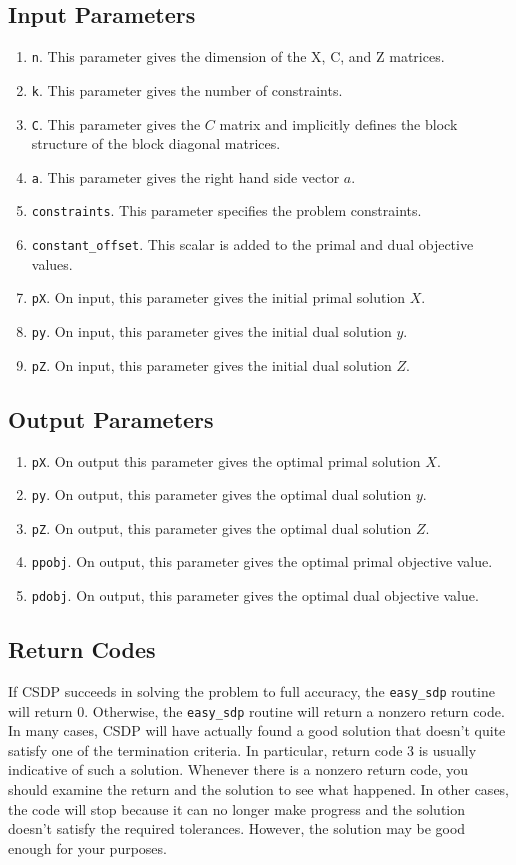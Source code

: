 \documentclass{article}
\begin{document}
\subsection*{Input Parameters}
\begin{enumerate}
\item {\tt n}. This parameter gives the dimension of the X, C, and Z matrices.
\item {\tt k}. This parameter gives the number of constraints.
\item {\tt C}.  This parameter gives the $C$ matrix and implicitly defines 
the block structure of the block diagonal matrices.
\item {\tt a}.  This parameter gives the right hand side vector $a$.
\item {\tt constraints}.  This parameter specifies the problem constraints.
\item {\tt constant\_offset}.  This scalar is added to the primal and dual 
objective values.  
\item {\tt pX}.  On input, this parameter gives the initial primal solution $X$.
\item {\tt py}.  On input, this parameter gives the initial dual solution $y$.
\item {\tt pZ}.  On input, this parameter gives the initial dual solution $Z$.
\end{enumerate}
\subsection*{Output Parameters}
\begin{enumerate}
\item {\tt pX}.  On output this parameter gives the optimal primal solution $X$. 
\item {\tt py}.  On output, this parameter gives the optimal dual solution $y$.
\item {\tt pZ}.  On output, this parameter gives the optimal dual solution $Z$.
\item {\tt ppobj}.  On output, this parameter gives the optimal primal objective value.
\item {\tt pdobj}.  On output, this parameter gives the optimal dual objective value.
\end{enumerate}
\subsection*{Return Codes}
If CSDP succeeds in solving the problem to full accuracy, 
the {\tt easy\_sdp} routine will return 0.  
Otherwise, the {\tt easy\_sdp} routine will return a nonzero
return code.  In many cases, CSDP will have actually found a good 
solution that doesn't quite satisfy one of the termination criteria.
In particular, return code 3 is usually indicative of such a solution.
Whenever there is a nonzero return code, you should examine the return 
and the solution to see what happened.  In other cases, the code will
stop because it can no longer make progress and the solution doesn't
satisfy the required tolerances.  However, the solution may be good
enough for your purposes.
\end{document}
